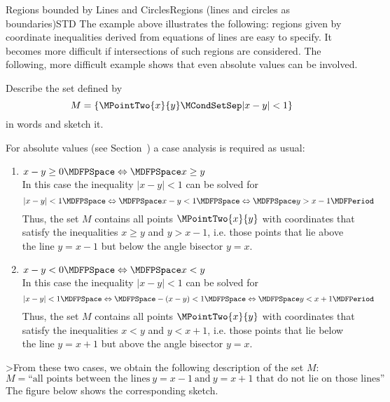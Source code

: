 \begin{MXContent}{Regions bounded by Lines and Circles}{Regions (lines and circles as boundaries)}{STD}
The example above illustrates the following: regions given by coordinate inequalities
derived from equations of lines are easy to specify. It becomes more difficult if intersections of 
such regions are considered. The following, more difficult example shows that even absolute values can be involved. 


\begin{MExample}
Describe the set defined by 
\[
 M=\{\MPointTwo{x}{y}\MCondSetSep |x-y|<1\}
\]
in words and sketch it.

For absolute values (see Section~) a case analysis is required as usual:
\begin{enumerate}
 \item $x-y\geq 0\MDFPSpace\Leftrightarrow\MDFPSpace x\geq y$\\
 In this case the inequality $|x-y|<1$ can be solved for
 \[
  |x-y|<1\MDFPSpace\Leftrightarrow\MDFPSpace x-y<1\MDFPSpace\Leftrightarrow\MDFPSpace y>x-1 \MDFPeriod
 \]
  Thus, the set $M$ contains all points $\MPointTwo{x}{y}$ with coordinates that satisfy the inequalities 
  $x\geq y$ and $y>x-1$, i.e. those points that lie above the line $y=x-1$ but below the angle bisector 
  $y=x$.
 \item $x-y< 0\MDFPSpace\Leftrightarrow\MDFPSpace x<y$\\
  In this case the inequality $|x-y|<1$ can be solved for
 \[
  |x-y|<1\MDFPSpace\Leftrightarrow\MDFPSpace -(x-y)<1\MDFPSpace\Leftrightarrow\MDFPSpace y<x+1 \MDFPeriod
 \]
  Thus, the set $M$ contains all points $\MPointTwo{x}{y}$ with coordinates that satisfy the inequalities 
  $x<y$ and $y<x+1$, i.e. those points that lie below the line $y=x+1$ but above the angle bisector $y=x$.
\end{enumerate}
>From these two cases, we obtain the following description of the set $M$:
\[
 M=\textrm{``all points between the lines}\ y=x-1\ \textrm{and}\ y=x+1\textrm{ that do not lie on those lines''}
\]
The figure below shows the corresponding sketch.
\begin{center}
\end{center}
\end{MExample}
\end{MXContent}
